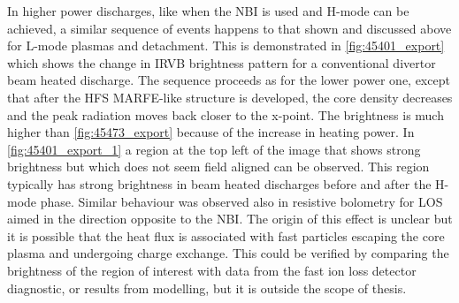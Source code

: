 In higher power discharges, like when the NBI is used and H-mode can be achieved, a similar sequence of events happens to that shown and discussed above for L-mode plasmas and detachment. This is demonstrated in \autoref{fig:45401_export} which shows the change in IRVB brightness pattern for a conventional divertor beam heated discharge. The sequence proceeds as for the lower power one, except that after the HFS MARFE-like structure is developed, the core density decreases and the peak radiation moves back closer to the x-point. The brightness is much higher than \autoref{fig:45473_export} because of the increase in heating power. In \autoref{fig:45401_export_1} a region at the top left of the image that shows strong brightness but which does not seem field aligned can be observed. This region typically has strong brightness in beam heated discharges before and after the H-mode phase. Similar behaviour was observed also in resistive bolometry for LOS aimed in the direction opposite to the NBI. The origin of this effect is unclear but it is possible that the heat flux is associated with fast particles escaping the core plasma and undergoing charge exchange. This could be verified by comparing the brightness of the region of interest with data from the fast ion loss detector diagnostic, or results from modelling, but it is outside the scope of thesis.

